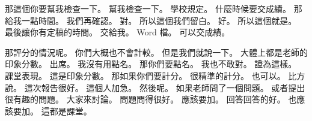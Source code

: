 \hypertarget{w01:cue:1509}{}那這個你要幫我檢查一下。
\hypertarget{w01:cue:1510}{}幫我檢查一下。
\hypertarget{w01:cue:1511}{}學校規定。
\hypertarget{w01:cue:1512}{}什麼時候要交成績。
\hypertarget{w01:cue:1513}{}那給我一點時間。
\hypertarget{w01:cue:1514}{}我們再確認。
\hypertarget{w01:cue:1515}{}對。
\hypertarget{w01:cue:1516}{}所以這個我們留白。
\hypertarget{w01:cue:1517}{}好。
\hypertarget{w01:cue:1518}{}所以這個就是。
\hypertarget{w01:cue:1519}{}最後讓你有定稿的時間。
\hypertarget{w01:cue:1520}{}交給我。
\hypertarget{w01:cue:1521}{}Word 檔。
\hypertarget{w01:cue:1522}{}可以交成績。

\hypertarget{w01:cue:1523}{}那評分的情況呢。
\hypertarget{w01:cue:1524}{}你們大概也不會計較。
\hypertarget{w01:cue:1525}{}但是我們就說一下。
\hypertarget{w01:cue:1526}{}大體上都是老師的印象分數。
\hypertarget{w01:cue:1527}{}出席。
\hypertarget{w01:cue:1528}{}我沒有用點名。
\hypertarget{w01:cue:1529}{}那你們要點名。
\hypertarget{w01:cue:1530}{}我也不敢對。
\hypertarget{w01:cue:1531}{}證為這樣。
\hypertarget{w01:cue:1532}{}課堂表現。
\hypertarget{w01:cue:1533}{}這是印象分數。
\hypertarget{w01:cue:1534}{}那如果你們要計分。
\hypertarget{w01:cue:1535}{}很精準的計分。
\hypertarget{w01:cue:1536}{}也可以。
\hypertarget{w01:cue:1537}{}比方說。
\hypertarget{w01:cue:1538}{}這次報告很好。
\hypertarget{w01:cue:1539}{}這個人加急。
\hypertarget{w01:cue:1540}{}然後呢。
\hypertarget{w01:cue:1541}{}如果老師問了一個問題。
\hypertarget{w01:cue:1542}{}或者提出很有趣的問題。
\hypertarget{w01:cue:1543}{}大家來討論。
\hypertarget{w01:cue:1544}{}問題問得很好。
\hypertarget{w01:cue:1545}{}應該要加。
\hypertarget{w01:cue:1546}{}回答回答的好。
\hypertarget{w01:cue:1547}{}也應該要加。
\hypertarget{w01:cue:1548}{}這都是課堂。

